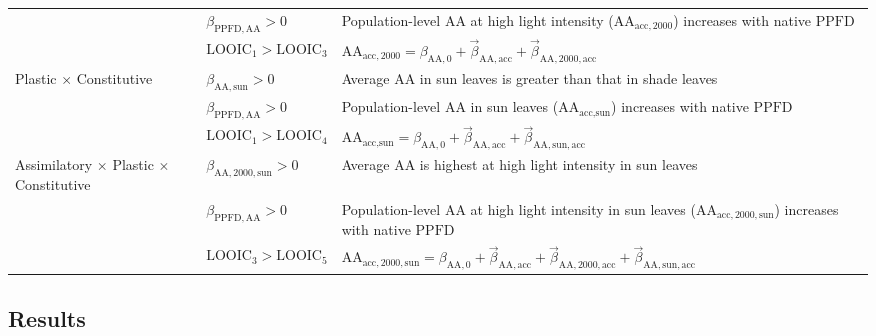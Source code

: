 \documentclass[
  letterpaper,
  DIV=11,
  numbers=noendperiod]{scrartcl}
\newcommand{\aax}{$\mathrm{AA}$}
\newcommand{\ppfd}{$\mathrm{PPFD}$}
\begin{document}
\begin{longtable}{>{\raggedright\arraybackslash}p{1in}>{\raggedright\arraybackslash}p{1.5in}>{\raggedright\arraybackslash}p{3in}}
\nopagebreak
 & $\beta_{\mathrm{PPFD,AA}} > 0$ & \hspace{-1em}Population-level \aax{} at high light intensity ($\mathrm{AA}_{\text{acc},2000}$) increases with native \ppfd\\
\nopagebreak
 & $\text{LOOIC}_\text{1} > \text{LOOIC}_\text{3}$ & \hspace{-1em}$\mathrm{AA}_{\text{acc},2000} = \beta_{\mathrm{AA}, 0} + \vec{\beta}_{\mathrm{AA}, \text{acc}} + \vec{\beta}_{\mathrm{AA}, 2000, \text{acc}}$\\
\cmidrule{1-3}\pagebreak[0]
Plastic $\times$ Constitutive & $\beta_{\mathrm{AA},\text{sun}} > 0$ & \hspace{-1em}Average \aax{} in sun leaves is greater than that in shade leaves\\
\nopagebreak
 & $\beta_{\mathrm{PPFD,AA}} > 0$ & \hspace{-1em}Population-level \aax{} in sun leaves ($\mathrm{AA}_{\text{acc},\text{sun}}$) increases with native \ppfd\\
\nopagebreak
 & $\text{LOOIC}_\text{1} > \text{LOOIC}_\text{4}$ & \hspace{-1em}$\mathrm{AA}_{\text{acc},\text{sun}} = \beta_{\mathrm{AA}, 0} + \vec{\beta}_{\mathrm{AA}, \text{acc}} + \vec{\beta}_{\mathrm{AA}, \text{sun}, \text{acc}}$\\
\cmidrule{1-3}\pagebreak[0]
Assimilatory $\times$ Plastic $\times$ Constitutive & $\beta_{\mathrm{AA},2000,\text{sun}} > 0$ & \hspace{-1em}Average \aax{} is highest at high light intensity in sun leaves\\
\nopagebreak
 & $\beta_{\mathrm{PPFD,AA}} > 0$ & \hspace{-1em}Population-level \aax{} at high light intensity in sun leaves ($\mathrm{AA}_{\text{acc},2000,\text{sun}}$) increases with native \ppfd\\
\nopagebreak
 & $\text{LOOIC}_\text{3} > \text{LOOIC}_\text{5}$ & \hspace{-1em}$\mathrm{AA}_{\text{acc},2000,\text{sun}} = \beta_{\mathrm{AA}, 0} + \vec{\beta}_{\mathrm{AA}, \text{acc}} + \vec{\beta}_{\mathrm{AA}, 2000, \text{acc}} + \vec{\beta}_{\mathrm{AA}, \text{sun}, \text{acc}}$\\
\bottomrule

\end{longtable}

\subsection{Results}\label{results}
\end{document}
